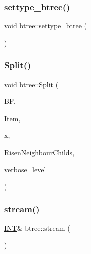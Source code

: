 \mbox{\label{classbtree_a5a1b9773c848908a6050cc733d2d9780}} 
\subsubsection{\texorpdfstring{settype\+\_\+btree()}{settype\_btree()}}
{\footnotesize\ttfamily void btree\+::settype\+\_\+btree (\begin{DoxyParamCaption}{ }\end{DoxyParamCaption})}

\mbox{\label{classbtree_a5596bf9f5e2d58fd57683d58c2c267d4}} 
\subsubsection{\texorpdfstring{Split()}{Split()}}
{\footnotesize\ttfamily void btree\+::\+Split (\begin{DoxyParamCaption}\item[{\mbox{\hyperlink{discreta_8h_a4966414b761cd8d10ba385fe5e7c07fc}{Buffer}} $\ast$}]{BF,  }\item[{\mbox{\hyperlink{discreta_8h_a2fdd526928017b3784ac2ea203f31011}{Item\+Typ}} $\ast$}]{Item,  }\item[{\mbox{\hyperlink{galois_8h_a09fddde158a3a20bd2dcadb609de11dc}{I\+NT}}}]{x,  }\item[{\mbox{\hyperlink{galois_8h_a09fddde158a3a20bd2dcadb609de11dc}{I\+NT}} $\ast$}]{Risen\+Neighbour\+Childs,  }\item[{\mbox{\hyperlink{galois_8h_a09fddde158a3a20bd2dcadb609de11dc}{I\+NT}}}]{verbose\+\_\+level }\end{DoxyParamCaption})}

\mbox{\label{classbtree_af99e68df8c3674b7d77ed80a8bbcffac}} 
\subsubsection{\texorpdfstring{stream()}{stream()}}
{\footnotesize\ttfamily \mbox{\hyperlink{galois_8h_a09fddde158a3a20bd2dcadb609de11dc}{I\+NT}}\& btree\+::stream (\begin{DoxyParamCaption}{ }\end{DoxyParamCaption})\hspace{0.3cm}{\ttfamily [inline]}}


